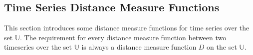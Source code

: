 \subsection{Time Series Distance Measure Functions}
This section introduces some distance measure functions for time series over the set $\mathbb{U}$. The requirement for
every distance measure function between two timeseries over the set $\mathbb{U}$ is always a distance measure function
$D$ on the set $\mathbb{U}$.



